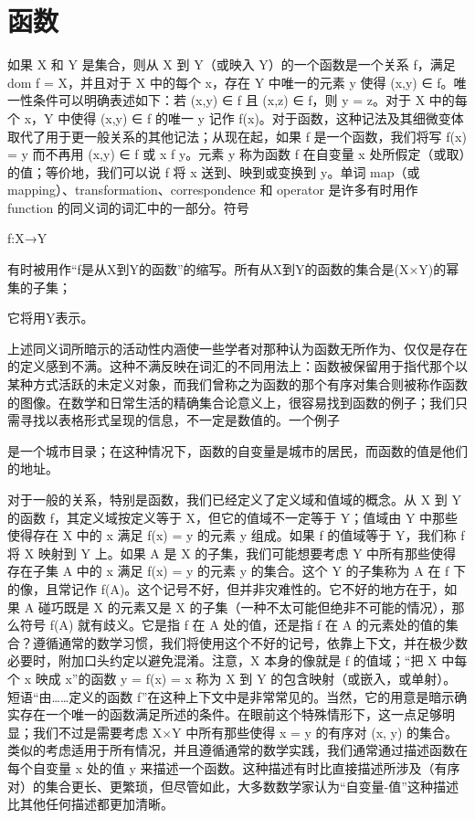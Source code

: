 \documentclass[12pt,a4paper]{ctexbook}
\theoremstyle{definition}
\theoremstyle{remark}
\begin{document}
\chapter{函数}

如果 X 和 Y 是集合，则从 X 到 Y（或映入 Y）的一个函数是一个关系 f，满足 dom f = X，并且对于 X 中的每个 x，存在 Y 中唯一的元素 y 使得 (x,y) ∈ f。唯一性条件可以明确表述如下：若 (x,y) ∈ f 且 (x,z) ∈ f，则 y = z。对于 X 中的每个 x，Y 中使得 (x,y) ∈ f 的唯一 y 记作 f(x)。对于函数，这种记法及其细微变体取代了用于更一般关系的其他记法；从现在起，如果 f 是一个函数，我们将写 f(x) = y 而不再用 (x,y) ∈ f 或 x f y。元素 y 称为函数 f 在自变量 x 处所假定（或取）的值；等价地，我们可以说 f 将 x 送到、映到或变换到 y。单词 map（或 mapping）、transformation、correspondence 和 operator 是许多有时用作 function 的同义词的词汇中的一部分。符号

f:X→Y

有时被用作“f是从X到Y的函数”的缩写。所有从X到Y的函数的集合是(X×Y)的幂集的子集；

它将用Y表示。

上述同义词所暗示的活动性内涵使一些学者对那种认为函数无所作为、仅仅是存在的定义感到不满。这种不满反映在词汇的不同用法上：函数被保留用于指代那个以某种方式活跃的未定义对象，而我们曾称之为函数的那个有序对集合则被称作函数的图像。在数学和日常生活的精确集合论意义上，很容易找到函数的例子；我们只需寻找以表格形式呈现的信息，不一定是数值的。一个例子

是一个城市目录；在这种情况下，函数的自变量是城市的居民，而函数的值是他们的地址。

对于一般的关系，特别是函数，我们已经定义了定义域和值域的概念。从 X 到 Y 的函数 f，其定义域按定义等于 X，但它的值域不一定等于 Y；值域由 Y 中那些使得存在 X 中的 x 满足 f(x) = y 的元素 y 组成。如果 f 的值域等于 Y，我们称 f 将 X 映射到 Y 上。如果 A 是 X 的子集，我们可能想要考虑 Y 中所有那些使得存在子集 A 中的 x 满足 f(x) = y 的元素 y 的集合。这个 Y 的子集称为 A 在 f 下的像，且常记作 f(A)。这个记号不好，但并非灾难性的。它不好的地方在于，如果 A 碰巧既是 X 的元素又是 X 的子集（一种不太可能但绝非不可能的情况），那么符号 f(A) 就有歧义。它是指 f 在 A 处的值，还是指 f 在 A 的元素处的值的集合？遵循通常的数学习惯，我们将使用这个不好的记号，依靠上下文，并在极少数必要时，附加口头约定以避免混淆。注意，X 本身的像就是 f 的值域；“把 X 中每个 x 映成 x”的函数 y = f(x) = x 称为 X 到 Y 的包含映射（或嵌入，或单射）。短语“由……定义的函数 f”在这种上下文中是非常常见的。当然，它的用意是暗示确实存在一个唯一的函数满足所述的条件。在眼前这个特殊情形下，这一点足够明显；我们不过是需要考虑 X×Y 中所有那些使得 x = y 的有序对 (x, y) 的集合。类似的考虑适用于所有情况，并且遵循通常的数学实践，我们通常通过描述函数在每个自变量 x 处的值 y 来描述一个函数。这种描述有时比直接描述所涉及（有序对）的集合更长、更繁琐，但尽管如此，大多数数学家认为“自变量-值”这种描述比其他任何描述都更加清晰。
\end{document}
